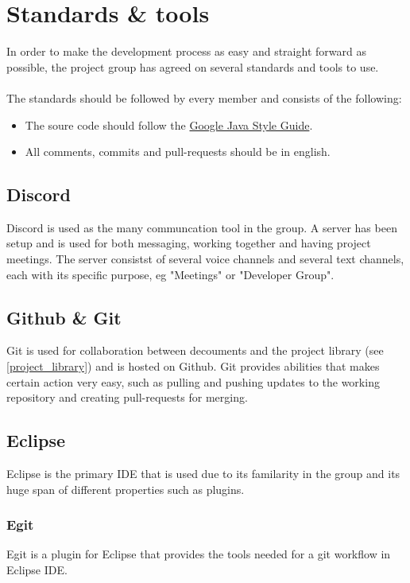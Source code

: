 \documentclass{article}
\begin{document}
\section{Standards \& tools}    %
    In order to make the development process as easy and straight forward as possible,
    the project group has agreed on several standards and tools to use. 
    \\ \\
    The standards should be followed by every member and consists of the following:
    \begin{itemize}
        \item The soure code should follow the
        \href{https://google.github.io/styleguide/javaguide.html}{Google Java Style Guide}.
        \item All comments, commits and pull-requests should be in english.
    \end{itemize}
    
    \subsection{Discord}
    Discord is used as the many communcation tool in the group. A server has been setup and is
    used for both messaging, working together and having project meetings.
    The server consistst of several voice channels and several text channels, each
    with its specific purpose, eg "Meetings" or "Developer Group".
    
    \subsection{Github \& Git}
    Git is used for collaboration between decouments and the project library (see \ref{project_library})
    and is hosted on Github. Git provides abilities that  makes certain action very
    easy, such as pulling and pushing updates to the working repository and creating pull-requests for merging.
    
    \subsection{Eclipse}
        Eclipse is the primary IDE that is used due to its familarity in
        the group and its huge span of different properties such as plugins.
    
        \subsubsection{Egit}
            Egit is a plugin for Eclipse that provides the tools needed for a git workflow 
            in Eclipse IDE.
            
\end{document}

